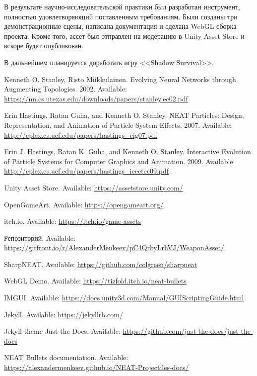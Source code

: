 ﻿

В результате научно-исследовательской практики был разработан инструмент, полностью удовлетворяющий поставленным требованиям. Были созданы три демонстрационные сцены, написана документация и сделана WebGL сборка проекта. Кроме того, ассет был отправлен на модерацию в Unity Asset Store и вскоре будет опубликован.

В дальнейшем планируется доработать игру <<Shadow Survival>>.

\pagebreak

\begin{thebibliography}{1}

     Kenneth O. Stanley, Risto Miikkulainen. \flqq Evolving Neural Networks through Augmenting Topologies\frqq. 2002. Available: \url{https://nn.cs.utexas.edu/downloads/papers/stanley.ec02.pdf}

     Erin Hastings, Ratan Guha, and Kenneth O. Stanley. \flqq NEAT Particles: Design, Representation, and Animation of Particle System Effects\frqq. 2007. Available: \url{http://eplex.cs.ucf.edu/papers/hastings_cig07.pdf}

     Erin J. Hastings, Ratan K. Guha, and Kenneth O. Stanley. \flqq Interactive Evolution of Particle Systems for Computer Graphics and Animation\frqq. 2009. Available: \url{http://eplex.cs.ucf.edu/papers/hastings_ieeetec09.pdf}

     Unity Asset Store. Available: \url{https://assetstore.unity.com/}

     OpenGameArt. Available: \url{https://opengameart.org/}

     itch.io. Available: \url{https://itch.io/game-assets}

     Репозиторий. Available: \url{https://gitfront.io/r/AlexanderMenkeev/pC4QrbyLrhVJ/WeaponAsset/}

     SharpNEAT. Available: \url{https://github.com/colgreen/sharpneat}

     WebGL Demo. Available: \url{https://tizfold.itch.io/neat-bullets}

     IMGUI. Available: \url{https://docs.unity3d.com/Manual/GUIScriptingGuide.html}

     Jekyll. Available: \url{https://jekyllrb.com/}

     Jekyll theme Just the Docs. Available: \url{https://github.com/just-the-docs/just-the-docs}

     NEAT Bullets documentation. Available: \url{https://alexandermenkeev.github.io/NEAT-Projectiles-docs/}

\end{thebibliography}